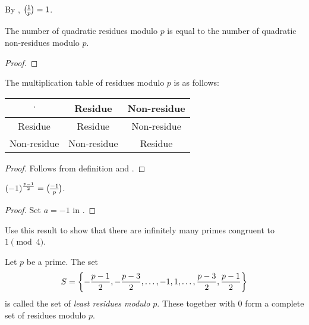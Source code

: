 \begin{remark}
    By , $\lgnd 1 p = 1$.
\end{remark}

\begin{corollary} \label{thm:quad_res:half}
    The number of quadratic residues modulo $p$ is equal to
    the number of quadratic non-residues modulo $p$.
\end{corollary}
\begin{proof}
    
\end{proof}

\begin{corollary} \label{thm:quad_res:product}
    The multiplication table of residues modulo $p$ is as follows:
    \begin{center}
        \begin{tabular}{c|c|c}
            $\cdot$ & Residue & Non-residue \\
            \hline
            Residue & Residue & Non-residue \\
            Non-residue & Non-residue & Residue
        \end{tabular}
    \end{center}
\end{corollary}
\begin{proof}
    Follows from definition and .
\end{proof}

\begin{corollary}
    $(-1)^{\frac{p-1}{2}} = \lgnd{-1}{p}$.
\end{corollary}
\begin{proof}
    Set $a = -1$ in .
\end{proof}

\begin{exercise}
    Use this result to show that there are infinitely many primes
    congruent to $1 \pmod{4}$.
\end{exercise}

\begin{definition} \label{def:quad_res:least_res}
    Let $p$ be a prime. The set \[
        S = \set{-\frac{p-1}{2}, -\frac{p-3}{2},
            \dots, -1, 1, \dots,
            \frac{p-3}{2}, \frac{p-1}{2}}
    \] is called the set of \emph{least residues modulo $p$}.
    These together with $0$ form a complete set of residues modulo $p$.
\end{definition}

